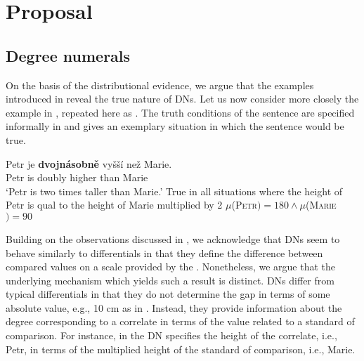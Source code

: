 \documentclass[output=paper,modfonts,hidelinks,newtxmath
\ChapterDOI{10.5281/zenodo.2545513}
]{langscibook}
\begin{document}
\section{Proposal}\label{proposal}

\subsection{Degree numerals}\label{degree-numerals}

On the basis of the distributional evidence, we argue that the  examples introduced in  reveal the true nature of DNs. Let us now consider more closely the example in , repeated here as . The truth conditions of the sentence are specified informally in  and  gives an exemplary situation in which the sentence would be true.

\ea\label{comp-ex} \gll Petr je \textbf{dvojnásobně} vyšší než Marie.\\
Petr is doubly higher than Marie\\
\glt `Petr is two times taller than Marie.'
\ea True in all situations where the height of Petr is qual to the height of Marie multiplied by 2\label{comp-ex-int-a} 
\ex $\mu$(\textsc{Petr}$) = 180 \wedge \mu$(\textsc{Marie}$) = 90$\label{comp-ex-int-b}
\z \z

\noindent Building on the observations discussed in , we acknowledge that DNs seem to behave similarly to differentials in that they define the difference between compared values on a scale provided by the . Nonetheless, we argue that the underlying mechanism which yields such a result is distinct. DNs differ from typical differentials in that they do not determine the gap in terms of some absolute value, e.g., 10 cm as in . Instead, they provide information about the degree corresponding to a correlate in terms of the value related to a standard of comparison. For instance, in  the DN specifies the height of the correlate, i.e., Petr, in terms of the multiplied height of the standard of comparison, i.e., Marie.
\end{document}
